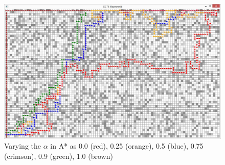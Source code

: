 \begin{figure}[!h]
\centering
\includegraphics[width=1\textwidth]{s-2-1.JPG}
\caption{Varying the $\alpha$ in A* as 0.0 (red), 0.25 (orange), 0.5 (blue), 0.75 (crimson), 0.9 (green), 1.0 (brown)}
\label{s-2}
\end{figure}

